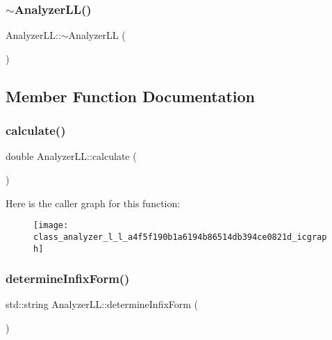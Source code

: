 \mbox{\label{class_analyzer_l_l_a4b5230af9d7ddc5a7f1b05d1d9b1b9d0}} 
\subsubsection{\texorpdfstring{$\sim$AnalyzerLL()}{~AnalyzerLL()}}
{\footnotesize\ttfamily Analyzer\+L\+L\+::$\sim$\+Analyzer\+LL (\begin{DoxyParamCaption}{ }\end{DoxyParamCaption})}



\subsection{Member Function Documentation}
\mbox{\label{class_analyzer_l_l_a4f5f190b1a6194b86514db394ce0821d}} 
\subsubsection{\texorpdfstring{calculate()}{calculate()}}
{\footnotesize\ttfamily double Analyzer\+L\+L\+::calculate (\begin{DoxyParamCaption}{ }\end{DoxyParamCaption})}

Here is the caller graph for this function\+:
\nopagebreak
\begin{figure}[H]
\begin{center}
\leavevmode
\texttt{[image: class\_analyzer\_l\_l\_a4f5f190b1a6194b86514db394ce0821d\_icgraph]}
\end{center}
\end{figure}
\mbox{\label{class_analyzer_l_l_a9a6ea6332fd95d472c49238ab1cba239}} 
\subsubsection{\texorpdfstring{determineInfixForm()}{determineInfixForm()}}
{\footnotesize\ttfamily std\+::string Analyzer\+L\+L\+::determine\+Infix\+Form (\begin{DoxyParamCaption}{ }\end{DoxyParamCaption})}

